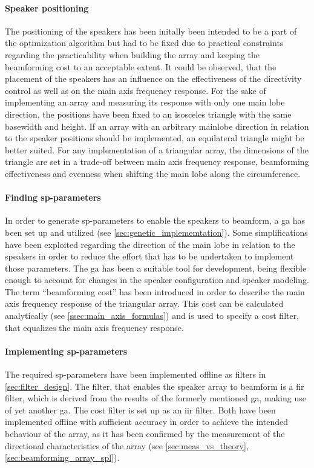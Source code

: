 \paragraph{Speaker positioning}
The positioning of the speakers has been initally been intended to be a part of the optimization algorithm but had to be fixed due to practical constraints regarding the practicability when building the array and keeping the beamforming cost to an acceptable extent. It could be observed, that the placement of the speakers has an influence on the effectiveness of the directivity control as well as on the main axis frequency response. For the sake of implementing an array and measuring its response with only one main lobe direction, the positions have been fixed to an isosceles triangle with the same basewidth and height. If an array with an arbitrary mainlobe direction in relation to the speaker positions should be implemented, an equilateral triangle might be better suited. For any implementation of a triangular array, the dimensions of the triangle are set in a trade-off between main axis frequency response, beamforming effectiveness and evenness when shifting the main lobe along the circumference.
\paragraph{Finding \gls{sp}-parameters}
In order to generate \gls{sp}-parameters to enable the speakers to beamform, a \gls{ga} has been set up and utilized (see \autoref{sec:genetic_implememtation}). Some simplifications have been exploited regarding the direction of the main lobe in relation to the speakers in order to reduce the effort that has to be undertaken to implement those parameters. The \gls{ga} has been a suitable tool for development, being flexible enough to account for changes in the speaker configuration and speaker modeling.\\
The term ``beamforming cost'' has been introduced in order to describe the main axis frequency response of the triangular array. This cost can be calculated analytically (see \autoref{ssec:main_axis_formulas}) and is used to specify a cost filter, that equalizes the main axis frequency response.
\paragraph{Implementing \gls{sp}-parameters}
The required \gls{sp}-parameters have been implemented offline as filters in \autoref{sec:filter_design}. The filter, that enables the speaker array to beamform is a \gls{fir} filter, which is derived from the results of the formerly mentioned \gls{ga}, making use of yet another \gls{ga}. The cost filter is set up as an \gls{iir} filter. Both have been implemented offline with sufficient accuracy in order to achieve the intended behaviour of the array, as it has been confirmed by the measurement of the directional characteristics of the array (see \autoref{sec:meas_vs_theory},\autoref{sec:beamforming_array_spl}). 
